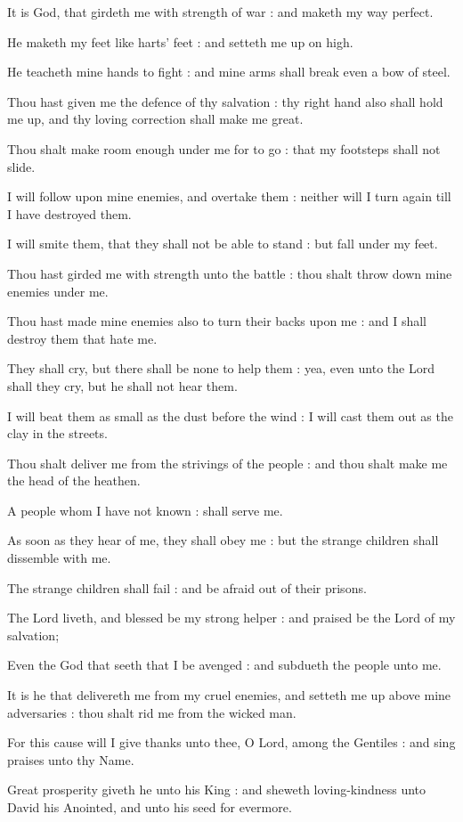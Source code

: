 It is God, that girdeth me with strength of war : and maketh my way perfect.\par
{}He maketh my feet like harts' feet : and setteth me up on high.\par
{}He teacheth mine hands to fight : and mine arms shall break even a bow of steel.\par
{}Thou hast given me the defence of thy salvation : thy right hand also shall hold me up, and thy loving correction shall make me great.\par
{}Thou shalt make room enough under me for to go : that my footsteps shall not slide.\par
{}I will follow upon mine enemies, and overtake them : neither will I turn again till I have destroyed them.\par
{}I will smite them, that they shall not be able to stand : but fall under my feet.\par
{}Thou hast girded me with strength unto the battle : thou shalt throw down mine enemies under me.\par
{}Thou hast made mine enemies also to turn their backs upon me : and I shall destroy them that hate me.\par
{}They shall cry, but there shall be none to help them : yea, even unto the Lord shall they cry, but he shall not hear them.\par
{}I will beat them as small as the dust before the wind : I will cast them out as the clay in the streets.\par
{}Thou shalt deliver me from the strivings of the people : and thou shalt make me the head of the heathen.\par
{}A people whom I have not known : shall serve me.\par
{}As soon as they hear of me, they shall obey me : but the strange children shall dissemble with me.\par
{}The strange children shall fail : and be afraid out of their prisons.\par
{}The Lord liveth, and blessed be my strong helper : and praised be the Lord of my salvation;\par
{}Even the God that seeth that I be avenged : and subdueth the people unto me.\par
{}It is he that delivereth me from my cruel enemies, and setteth me up above mine adversaries : thou shalt rid me from the wicked man.\par
{}For this cause will I give thanks unto thee, O Lord, among the Gentiles : and sing praises unto thy Name.\par
{}Great prosperity giveth he unto his King : and sheweth loving-kindness unto David his Anointed, and unto his seed for evermore.\par


